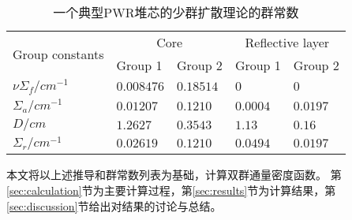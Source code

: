 \begin{table}[H]
    \centering
    \caption{一个典型PWR堆芯的少群扩散理论的群常数}
    \label{tab:constants}
    \begin{tabular}{lllll}
    \toprule
    \multirow{2}{*}{Group constants} & \multicolumn{2}{c}{Core} & \multicolumn{2}{c}{Reflective layer} \\
    \cmidrule(lr){2-3}\cmidrule(lr){4-5}
     & Group 1 & Group 2 & Group 1 & Group 2 \\
    \midrule
    $\nu\Sigma_f/\si{cm^{-1}}$ & $0.008476$ & $0.18514$ & $0$ & $0$ \\
    $\Sigma_a/\si{cm^{-1}}$ & $0.01207$ & $0.1210$ & $0.0004$ & $0.0197$ \\
    $D/\si{cm}$ & $1.2627$ & $0.3543$ & $1.13$ & $0.16$ \\
    $\Sigma_r/\si{cm^{-1}}$ & $0.02619$ & $0.1210$ & $0.0494$ & $0.0197$ \\
    \bottomrule
    \end{tabular}
\end{table}

本文将以上述推导和群常数列表为基础，计算双群通量密度函数。
第\ref{sec:calculation}节为主要计算过程，第\ref{sec:results}节为计算结果，第\ref{sec:discussion}节给出对结果的讨论与总结。
